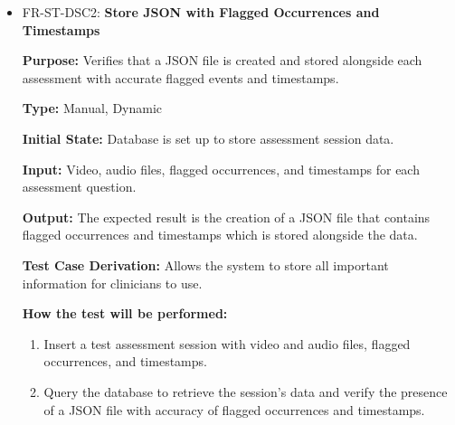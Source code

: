 \documentclass[12pt, titlepage]{article}
\begin{document}
\begin{itemize}
  \item FR-ST-DSC2: \textbf{Store JSON with Flagged Occurrences and Timestamps}
  \begin{mdframed}[linewidth=0.5mm]
      \textbf{Purpose:} Verifies that a JSON file is created and stored alongside each assessment with accurate flagged events and timestamps. \par
      \textbf{Type:} Manual, Dynamic \par
      \textbf{Initial State:} Database is set up to store assessment session data. \par
      \textbf{Input:} Video, audio files, flagged occurrences, and timestamps for each assessment question. \par
      \textbf{Output:} The expected result is the creation of a JSON file that contains flagged occurrences and timestamps which is stored alongside the data. \par
      \textbf{Test Case Derivation:} Allows the system to store all important information for clinicians to use. \par
      \textbf{How the test will be performed:}
      \begin{enumerate}[noitemsep]
        \item Insert a test assessment session with video and audio files, flagged occurrences, and timestamps.
        \item Query the database to retrieve the session’s data and verify the presence of a JSON file with accuracy of flagged occurrences and timestamps.
      \end{enumerate}
  \end{mdframed}


\end{itemize}
\end{document}
